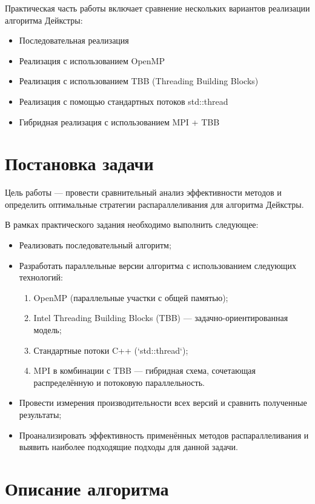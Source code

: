 \documentclass[12pt]{article}
\begin{document}
Практическая часть работы включает сравнение нескольких вариантов реализации алгоритма Дейкстры:
\begin{itemize}
\item Последовательная реализация
\item Реализация с использованием OpenMP
\item Реализация с использованием TBB (Threading Building Blocks)
\item Реализация с помощью стандартных потоков std::thread
\item Гибридная реализация с использованием MPI + TBB 
\end{itemize}
\section{Постановка задачи}

\hspace*{1.25em}Цель работы — провести сравнительный анализ эффективности методов и определить оптимальные стратегии распараллеливания для алгоритма Дейкстры.

В рамках практического задания необходимо выполнить следующее:

\begin{itemize}
    \item Реализовать последовательный алгоритм;
    \item Разработать параллельные версии алгоритма с использованием следующих технологий:
    \begin{enumerate}
        \item OpenMP (параллельные участки с общей памятью);
        \item Intel Threading Building Blocks (TBB) — задачно-ориентированная модель;
        \item Стандартные потоки C++ (`std::thread`);
        \item MPI в комбинации с TBB — гибридная схема, сочетающая распределённую и потоковую параллельность.
    \end{enumerate}
    \item Провести измерения производительности всех версий и сравнить полученные результаты;
    \item Проанализировать эффективность применённых методов распараллеливания и выявить наиболее подходящие подходы для данной задачи.
\end{itemize}

\section{Описание алгоритма}
\end{document}
